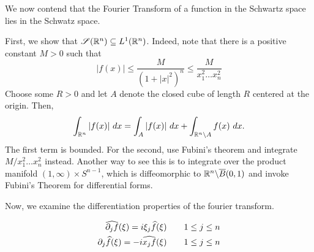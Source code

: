 We now contend that the Fourier Transform of a function in the Schwartz space lies in the Schwatz space.

First, we show that $\mathscr S(\mathbb{R}^n)\subseteq L^1(\mathbb{R}^n)$. Indeed, note that there is a positive constant $M > 0$ such that 
\begin{equation*}
    |f(x)|\le\frac{M}{(1 + |x|^2)^n}\le\frac{M}{x_1^2\dots x_n^2}
\end{equation*}
Choose some $R > 0$ and let $A$ denote the closed cube of length $R$ centered at the origin. Then,
\begin{equation*}
    \int_{\mathbb{R}^n}|f(x)|~dx = \int_A |f(x)|~dx + \int_{\mathbb{R}^n\backslash A}f(x)~dx.
\end{equation*}
The first term is bounded. For the second, use Fubini's theorem and integrate $M/x_1^2\dots x_n^2$ instead. Another way to see this is to integrate over the product manifold $(1,\infty)\times S^{n - 1}$, which is diffeomorphic to $\mathbb{R}^n\backslash\overline B(0, 1)$ and invoke Fubini's Theorem for differential forms.

Now, we examine the differentiation properties of the fourier transform.

\begin{align*}
    \widehat{\partial_j f}(\xi) = i\xi_j\widehat{f}(\xi)\qquad 1\le j\le n\\
    \partial_j\widehat{f}(\xi) = -i\widehat{x_j f}(\xi)\qquad 1\le j\le n
\end{align*}